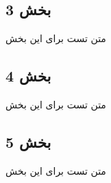 \subsection*{بخش 3}
متن تست برای این بخش
\subsection*{بخش 4}
متن تست برای این بخش
\subsection*{بخش 5}
متن تست برای این بخش
